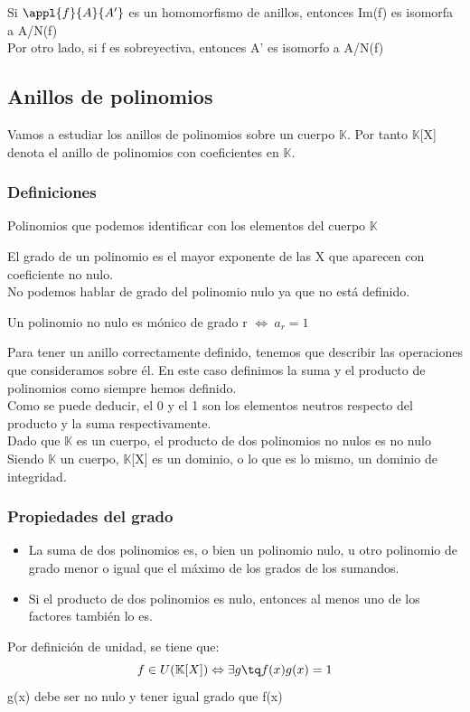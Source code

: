 \documentclass[nochap]{apuntes}
\begin{document}
\begin{theorem}
 Si  $\appl{f}{A}{A'}$  es un homomorfismo de anillos, entonces Im(f) es isomorfa a A/N(f)\\
 Por otro lado, si f es sobreyectiva, entonces A' es isomorfo a A/N(f)
\end{theorem}

\subsection{Anillos de polinomios}
Vamos a estudiar los anillos de polinomios sobre un cuerpo $\mathbb{K}$. Por tanto $\mathbb{K}$[X] denota el anillo de polinomios con 
coeficientes en $\mathbb{K}$.\\
\subsubsection{Definiciones}
\begin{defn}
 Polinomios que podemos identificar con los elementos del cuerpo $\mathbb{K}$
\end{defn}
\begin{defn}[Grado]
 El grado de un polinomio es el mayor exponente de las X que aparecen con coeficiente no nulo.\\
 No podemos hablar de grado del polinomio nulo ya que no está definido.
\end{defn}
\begin{defn}[Mónico]
 Un polinomio no nulo es mónico de grado r $\Leftrightarrow \ a_r=1$
\end{defn}

Para tener un anillo correctamente definido, tenemos que describir las operaciones que consideramos sobre él. En este caso definimos la suma
y el producto de polinomios como siempre hemos definido.\\
Como se puede deducir, el 0 y el 1 son los elementos neutros respecto del producto y la suma respectivamente.\\
\obs Dado que $\mathbb{K}$  es un cuerpo, el producto de dos polinomios no nulos es no nulo
\obs Siendo $\mathbb{K}$  un cuerpo, $\mathbb{K}$[X] es un dominio, o lo que es lo mismo, un dominio de integridad.

\subsubsection{Propiedades del grado}
\begin{itemize}
 \item La suma de dos polinomios es, o bien un polinomio nulo, u otro polinomio de grado menor o igual que el máximo de los grados de los sumandos.
 \item Si el producto de dos polinomios es nulo, entonces al menos uno de los factores también lo es.
\end{itemize}
Por definición de unidad, se tiene que:
\[f\in U(\mathbb{K}[X]) \Leftrightarrow \exists g \tq f(x)g(x)=1\]
g(x) debe ser no nulo y tener igual grado que f(x)\\
\end{document}
